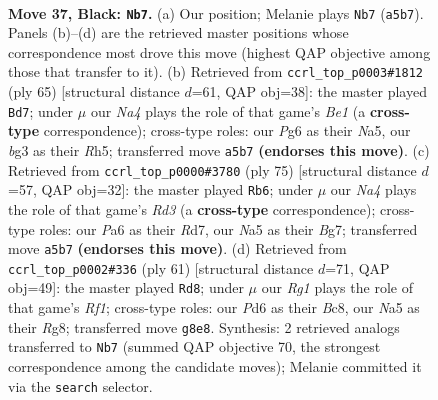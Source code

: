 \documentclass[11pt]{article}
\begin{document}
\clearpage

\begin{figure}[p]\centering
\begin{subfigure}{0.46\textwidth}\centering
\resizebox{\linewidth}{!}{%
\newchessgame
\chessboard[
  setfen={r5r1/5kbp/p2p2p1/n3p1P1/1p2P2P/1P3PBR/P1PK2B1/R7 b - - 4 37},
  showmover=false,
  pgfstyle=straightmove, color=movearrow, markmove={a5-b7}
]}
\caption{}
\end{subfigure}\hfill
\begin{subfigure}{0.46\textwidth}\centering
\resizebox{\linewidth}{!}{%
\newchessgame
\chessboard[
  setfen={4bk1r/p4pp1/1p6/nPp2P1r/P2pP3/3B2P1/2P2N2/2K1R1R1 b - - 0 33},
  showmover=false,
  pgfstyle=straightmove, color=movearrow, markmove={e8-d7}
]}
\caption{}
\end{subfigure}
\\[4pt]
\begin{subfigure}{0.46\textwidth}\centering
\resizebox{\linewidth}{!}{%
\newchessgame
\chessboard[
  setfen={8/3rk1b1/3rp1p1/p1p2p1p/7P/1PPP2P1/P1R1BPK1/1R6 b - - 11 38},
  showmover=false,
  pgfstyle=straightmove, color=movearrow, markmove={d6-b6}
]}
\caption{}
\end{subfigure}\hfill
\begin{subfigure}{0.46\textwidth}\centering
\resizebox{\linewidth}{!}{%
\newchessgame
\chessboard[
  setfen={2b2rr1/p3kn1p/3pp3/2p2pPP/2P4K/1P1R1B1N/P5P1/3R4 b - - 12 31},
  showmover=false,
  pgfstyle=straightmove, color=movearrow, markmove={f8-d8}
]}
\caption{}
\end{subfigure}
\caption{\textbf{Move 37, Black: \texttt{Nb7}.} (a) Our position; Melanie plays \texttt{Nb7} (\texttt{a5b7}). Panels (b)--(d) are the retrieved master positions whose correspondence most drove this move (highest QAP objective among those that transfer to it). (b) Retrieved from \texttt{ccrl\_top\_p0003\#1812} (ply 65) [structural distance $d$=61, QAP obj=38]: the master played \texttt{Bd7}; under $\mu$ our \emph{Na4} plays the role of that game's \emph{Be1} (a \textbf{cross-type} correspondence); cross-type roles: our \emph{P}g6 as their \emph{N}a5, our \emph{b}g3 as their \emph{R}h5; transferred move \texttt{a5b7} \textbf{(endorses this move)}. (c) Retrieved from \texttt{ccrl\_top\_p0000\#3780} (ply 75) [structural distance $d$=57, QAP obj=32]: the master played \texttt{Rb6}; under $\mu$ our \emph{Na4} plays the role of that game's \emph{Rd3} (a \textbf{cross-type} correspondence); cross-type roles: our \emph{P}a6 as their \emph{R}d7, our \emph{N}a5 as their \emph{B}g7; transferred move \texttt{a5b7} \textbf{(endorses this move)}. (d) Retrieved from \texttt{ccrl\_top\_p0002\#336} (ply 61) [structural distance $d$=71, QAP obj=49]: the master played \texttt{Rd8}; under $\mu$ our \emph{Rg1} plays the role of that game's \emph{Rf1}; cross-type roles: our \emph{P}d6 as their \emph{B}c8, our \emph{N}a5 as their \emph{R}g8; transferred move \texttt{g8e8}. Synthesis: 2 retrieved analogs transferred to \texttt{Nb7} (summed QAP objective 70, the strongest correspondence among the candidate moves); Melanie committed it via the \texttt{search} selector.}
\label{fig:thought-m73}
\end{figure}
\end{document}
